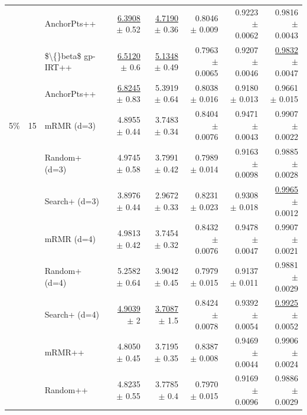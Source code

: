 \begin{longtable}{llp{}rrrrr}
 &  & AnchorPts++ & \underline{6.3908} {\scriptsize $\pm$ 0.52} & \underline{4.7190} {\scriptsize $\pm$ 0.36} & 0.8046 {\scriptsize $\pm$ 0.009} & 0.9223 {\scriptsize $\pm$ 0.0062} & 0.9816 {\scriptsize $\pm$ 0.0043} \\
 &  & \$\textbackslash\{\}beta\$ gp-IRT++ & \underline{6.5120} {\scriptsize $\pm$ 0.6} & \underline{5.1348} {\scriptsize $\pm$ 0.49} & 0.7963 {\scriptsize $\pm$ 0.0065} & 0.9207 {\scriptsize $\pm$ 0.0046} & \underline{0.9832} {\scriptsize $\pm$ 0.0047} \\
 &  & AnchorPts++ & \underline{6.8245} {\scriptsize $\pm$ 0.83} & 5.3919 {\scriptsize $\pm$ 0.64} & 0.8038 {\scriptsize $\pm$ 0.016} & 0.9180 {\scriptsize $\pm$ 0.013} & 0.9661 {\scriptsize $\pm$ 0.015} \\
\midrule
5\% & 15 & mRMR (d=3) & 4.8955 {\scriptsize $\pm$ 0.44} & 3.7483 {\scriptsize $\pm$ 0.34} & 0.8404 {\scriptsize $\pm$ 0.0076} & 0.9471 {\scriptsize $\pm$ 0.0043} & 0.9907 {\scriptsize $\pm$ 0.0022} \\
 &  & Random+ (d=3) & 4.9745 {\scriptsize $\pm$ 0.58} & 3.7991 {\scriptsize $\pm$ 0.42} & 0.7989 {\scriptsize $\pm$ 0.014} & 0.9163 {\scriptsize $\pm$ 0.0098} & 0.9885 {\scriptsize $\pm$ 0.0028} \\
 &  & Search+ (d=3) & 3.8976 {\scriptsize $\pm$ 0.44} & 2.9672 {\scriptsize $\pm$ 0.33} & 0.8231 {\scriptsize $\pm$ 0.023} & 0.9308 {\scriptsize $\pm$ 0.018} & \underline{0.9965} {\scriptsize $\pm$ 0.0012} \\
 &  & mRMR (d=4) & 4.9813 {\scriptsize $\pm$ 0.42} & 3.7454 {\scriptsize $\pm$ 0.32} & 0.8432 {\scriptsize $\pm$ 0.0076} & 0.9478 {\scriptsize $\pm$ 0.0047} & 0.9907 {\scriptsize $\pm$ 0.0021} \\
 &  & Random+ (d=4) & 5.2582 {\scriptsize $\pm$ 0.64} & 3.9042 {\scriptsize $\pm$ 0.45} & 0.7979 {\scriptsize $\pm$ 0.015} & 0.9137 {\scriptsize $\pm$ 0.011} & 0.9881 {\scriptsize $\pm$ 0.0029} \\
 &  & Search+ (d=4) & \underline{4.9039} {\scriptsize $\pm$ 2} & \underline{3.7087} {\scriptsize $\pm$ 1.5} & 0.8424 {\scriptsize $\pm$ 0.0078} & 0.9392 {\scriptsize $\pm$ 0.0054} & \underline{0.9925} {\scriptsize $\pm$ 0.0052} \\
 &  & mRMR++ & 4.8050 {\scriptsize $\pm$ 0.45} & 3.7195 {\scriptsize $\pm$ 0.35} & 0.8387 {\scriptsize $\pm$ 0.008} & 0.9469 {\scriptsize $\pm$ 0.0044} & 0.9906 {\scriptsize $\pm$ 0.0024} \\
 &  & Random++ & 4.8235 {\scriptsize $\pm$ 0.55} & 3.7785 {\scriptsize $\pm$ 0.4} & 0.7970 {\scriptsize $\pm$ 0.015} & 0.9169 {\scriptsize $\pm$ 0.0096} & 0.9886 {\scriptsize $\pm$ 0.0029} \\

\end{longtable}
